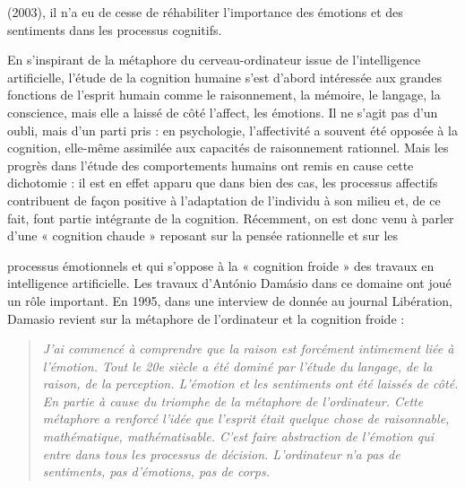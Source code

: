 (2003), il n’a eu de cesse de réhabiliter l'importance des émotions et des sentiments dans les processus cognitifs.\par

 En s’inspirant de la métaphore du cerveau-ordinateur issue de l'intelligence artificielle, l’étude de la cognition humaine s’est d’abord intéressée aux grandes fonctions de l’esprit humain comme le raisonnement, la mémoire, le langage, la conscience, mais elle a laissé de côté l’affect, les émotions. Il ne s’agit pas d’un oubli, mais d’un parti pris : en psychologie, l’affectivité a souvent été opposée à la cognition, elle-même assimilée aux capacités de raisonnement rationnel. Mais les progrès dans l'étude des comportements humains ont remis en cause cette dichotomie : il est en effet apparu que dans bien des cas, les processus affectifs contribuent de façon positive à l’adaptation de l'individu à son milieu et, de ce fait, font partie intégrante de la cognition. Récemment, on est donc venu à parler d’une « cognition chaude » reposant sur la pensée rationnelle et sur les\par


processus émotionnels et qui s'oppose à la « cognition froide » des travaux en intelligence artificielle. Les travaux d’António Damásio dans ce domaine ont joué un rôle important. En 1995, dans une interview de donnée au journal Libération, Damasio revient sur la métaphore de l'ordinateur et la cognition froide :\par\begin{quote}\small\itshape J'ai commencé à comprendre que la raison est forcément intimement liée à l'émotion. Tout le 20e siècle a été dominé par l'étude du langage, de la raison, de la perception. L'émotion et les sentiments ont été laissés de côté. En partie à cause du triomphe de la métaphore de l'ordinateur. Cette métaphore a renforcé l'idée que l'esprit était quelque chose de raisonnable, mathématique, mathématisable. C'est faire abstraction de l'émotion qui entre dans tous les processus de décision. L'ordinateur n'a pas de sentiments, pas d'émotions, pas de corps.\end{quote}


